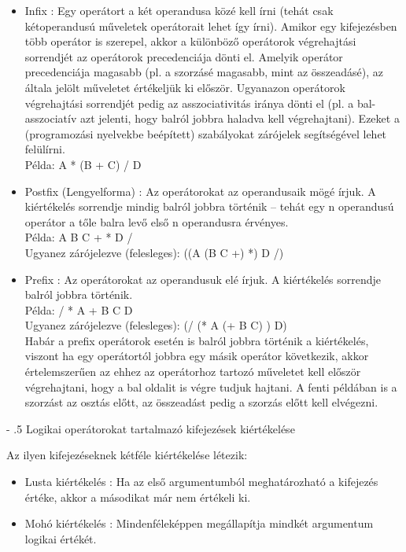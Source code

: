 \documentclass[margin=0px]{article}
\makeatletter
\renewcommand\paragraph{%
	\@startsection{paragraph}{4}{0mm}%
	{-\baselineskip}%
	{.5\baselineskip}%
	{\normalfont\normalsize\bfseries}}
\makeatother
\begin{document}
	\begin{itemize}
		\item	Infix : Egy operátort a két operandusa közé kell írni (tehát csak kétoperandusú műveletek operátorait
		lehet így írni).
		Amikor egy kifejezésben több operátor is szerepel, akkor a különböző operátorok végrehajtási
		sorrendjét az operátorok precedenciája dönti el. Amelyik operátor precedenciája magasabb (pl. a
		szorzásé magasabb, mint az összeadásé), az általa jelölt műveletet értékeljük ki először. Ugyanazon
		operátorok végrehajtási sorrendjét pedig az asszociativitás iránya dönti el (pl. a bal-asszociatív azt
		jelenti, hogy balról jobbra haladva kell végrehajtani). Ezeket a (programozási nyelvekbe beépített)
		szabályokat zárójelek segítségével lehet felülírni.\\
		Példa: A * (B + C) / D
		
		\item	Postfix (Lengyelforma) : Az operátorokat az operandusaik mögé írjuk. A kiértékelés sorrendje mindig balról jobbra
		történik – tehát egy n operandusú operátor a tőle balra levő első n operandusra érvényes.\\
		Példa: A B C + * D /\\
		Ugyanez zárójelezve (felesleges): ((A (B C +) *) D /)
		
		\item	Prefix : Az operátorokat az operandusuk elé írjuk. A kiértékelés sorrendje balról
		jobbra történik.\\
		Példa: / * A + B C D\\
		Ugyanez zárójelezve (felesleges): (/ (* A (+ B C) ) D)\\
		Habár a prefix operátorok esetén is balról jobbra történik a kiértékelés, viszont ha egy operátortól
		jobbra egy másik operátor következik, akkor értelemszerűen az ehhez az operátorhoz tartozó
		műveletet kell először végrehajtani, hogy a bal oldalit is végre tudjuk hajtani. A fenti példában is a
		szorzást az osztás előtt, az összeadást pedig a szorzás előtt kell elvégezni.
	\end{itemize}
	
	\paragraph{Logikai operátorokat tartalmazó kifejezések kiértékelése}

	\noindent Az ilyen kifejezéseknek kétféle kiértékelése létezik:
	\begin{itemize}
		\item	Lusta kiértékelés : Ha az első argumentumból meghatározható a kifejezés értéke, akkor a másodikat
		már nem értékeli ki.
		\item	Mohó kiértékelés : Mindenféleképpen megállapítja mindkét argumentum logikai értékét.
	\end{itemize}	
\end{document}
